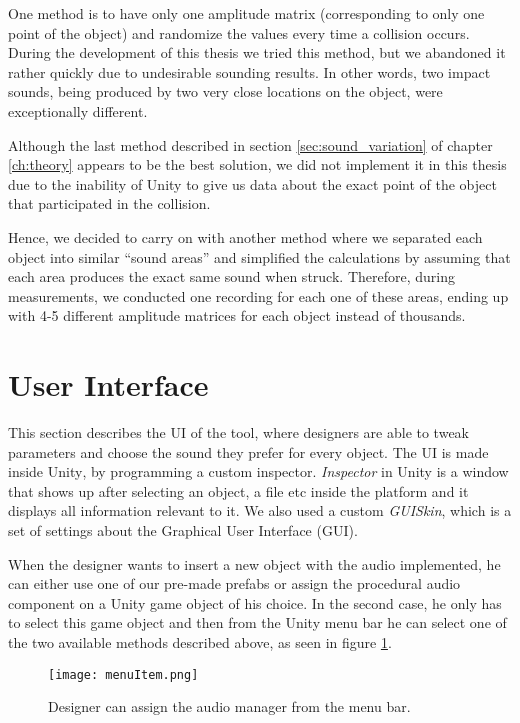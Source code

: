 One method is to have only one amplitude matrix (corresponding to only one point of the object) and randomize the values every time a collision occurs. During the development of this thesis we tried this method, but we abandoned it rather quickly due to undesirable sounding results. In other words, two impact sounds, being produced by two very close locations on the object, were exceptionally different.

Although the last method described in section \ref{sec:sound_variation} of chapter \ref{ch:theory} appears to be the best solution, we did not implement it in this thesis due to the inability of Unity\textsuperscript{\textregistered} to give us data about the exact point of the object that participated in the collision.

Hence, we decided to carry on with another method where we separated each object into similar ``sound areas'' and simplified the calculations by assuming that each area produces the exact same sound when struck. Therefore, during measurements, we conducted one recording for each one of these areas, ending up with 4-5 different amplitude matrices for each object instead of thousands.

\section{User Interface}\label{sec:UI}
This section describes the \gls{UI} of the tool, where designers are able to tweak parameters and choose the sound they prefer for every object. The UI is made inside Unity\textsuperscript{\textregistered}, by programming a custom inspector. \textit{Inspector} in Unity\textsuperscript{\textregistered} is a window that shows up after selecting an object, a file etc inside the platform and it displays all information relevant to it. We also used a custom \textit{GUISkin}, which is a set of settings about the Graphical User Interface (GUI). 

When the designer wants to insert a new object with the audio implemented, he can either use one of our pre-made prefabs or assign the procedural audio component on a Unity\textsuperscript{\textregistered} game object of his choice. In the second case, he only has to select this game object and then from the Unity\textsuperscript{\textregistered} menu bar he can select one of the two available methods described above, as seen in figure \ref{fig:menu_item}.

\begin{figure}[H]
  \centering
    \texttt{[image: menuItem.png]}
      \caption{Designer can assign the audio manager from the menu bar.}
      \label{fig:menu_item}
\end{figure}

